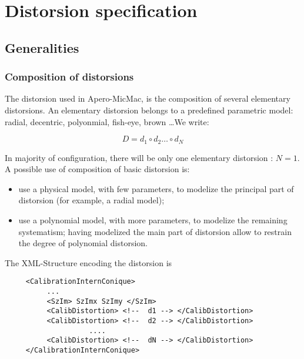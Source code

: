 
\section{Distorsion specification}


\subsection{Generalities}

\subsubsection{Composition of distorsions}
\label{ComposDist}
The distorsion used in Apero-MicMac, is the composition of several elementary
distorsions. An elementary distorsion belongs to a predefined parametric model: radial,
decentric, polyonmial, fish-eye, brown \dots We write:

\begin{equation}
    D = d_1 \circ d_2  \dots  \circ d_N
\end{equation}

In majority of configuration, there will be only one elementary distorsion : $N=1$.
A possible use of composition of basic distorsion is:

\begin{itemize}
   \item use a physical model, with few parameters, to modelize the principal
         part of distorsion (for example, a radial model);

   \item use a polynomial model,  with more parameters, to modelize the remaining
         systematism; having modelized the main part of distorsion allow to restrain
         the degree of polynomial distorsion.
\end{itemize}

The XML-Structure encoding the distorsion is

\begin{verbatim}
     <CalibrationInternConique>
          ...
          <SzIm> SzImx SzImy </SzIm>
          <CalibDistortion> <!--  d1 --> </CalibDistortion>
          <CalibDistortion> <!--  d2 --> </CalibDistortion>
                    ....
          <CalibDistortion> <!--  dN --> </CalibDistortion>
     </CalibrationInternConique>
\end{verbatim}

